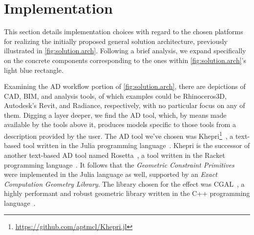 \section{Implementation}%
\label{sec:solution.impl}

This section details implementation choices with regard to the chosen platforms
for realizing the initially proposed general solution architecture, previously
illustrated in \cref{fig:solution.arch}. Following a brief analysis, we expand
specifically on the concrete components corresponding to the ones within
\cref{fig:solution.arch}'s light blue rectangle.

Examining the \ac{AD} workflow portion of \cref{fig:solution.arch}, there are
depictions of \ac{CAD}, \ac{BIM}, and analysis tools, of which examples could be
Rhinoceros3D, Autodesk's Revit, and Radiance, respectively, with no particular
focus on any of them.  Digging a layer deeper, we find the \ac{AD} tool, which,
by means made available by the tools above it, produces models specific to those
tools from a description provided by the user.  The \ac{AD} tool we've chosen
was
Khepri\footnote{\url{https://github.com/aptmcl/Khepri.jl}}~\cite{Leitao:2019:GRUGEAV},
a text-based tool written in the Julia programming
language~\cite{Bezanson:2017:JAFANC}.  Khepri is the successor of another
text-based \ac{AD} tool named Rosetta~\cite{Leitao:2011:PGDCAD}, a tool written
in the Racket programming language~\cite{PLT:2010:Reference}.  It follows that
the \textit{Geometric Constraint Primitives} were implemented in the Julia
language as well, supported by an \textit{Exact Computation Geometry Library}.
The library chosen for the effect was \ac{CGAL}~\cite{CGAL:5.3:Project}, a
highly performant and robust geometric library written in the C++ programming
language~\cite{Stroustrup:2013:CPP}.


